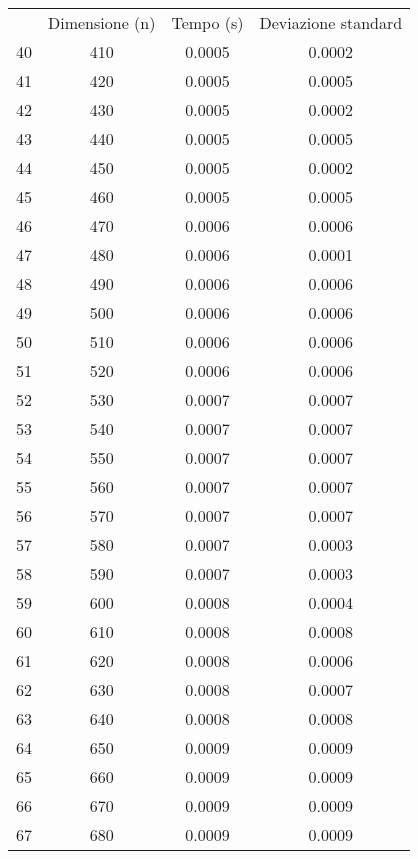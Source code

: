 \begin{table}
\centering
\begin{adjustbox}{width=1\textwidth/2}
\begin{tabular}{|c|c|c|c|}
\hline
 & Dimensione (n) & Tempo (s) & Deviazione standard \\
40 & 410 & 0.0005 & 0.0002 \\
\cline{1-4}
41 & 420 & 0.0005 & 0.0005 \\
\cline{1-4}
42 & 430 & 0.0005 & 0.0002 \\
\cline{1-4}
43 & 440 & 0.0005 & 0.0005 \\
\cline{1-4}
44 & 450 & 0.0005 & 0.0002 \\
\cline{1-4}
45 & 460 & 0.0005 & 0.0005 \\
\cline{1-4}
46 & 470 & 0.0006 & 0.0006 \\
\cline{1-4}
47 & 480 & 0.0006 & 0.0001 \\
\cline{1-4}
48 & 490 & 0.0006 & 0.0006 \\
\cline{1-4}
49 & 500 & 0.0006 & 0.0006 \\
\cline{1-4}
50 & 510 & 0.0006 & 0.0006 \\
\cline{1-4}
51 & 520 & 0.0006 & 0.0006 \\
\cline{1-4}
52 & 530 & 0.0007 & 0.0007 \\
\cline{1-4}
53 & 540 & 0.0007 & 0.0007 \\
\cline{1-4}
54 & 550 & 0.0007 & 0.0007 \\
\cline{1-4}
55 & 560 & 0.0007 & 0.0007 \\
\cline{1-4}
56 & 570 & 0.0007 & 0.0007 \\
\cline{1-4}
57 & 580 & 0.0007 & 0.0003 \\
\cline{1-4}
58 & 590 & 0.0007 & 0.0003 \\
\cline{1-4}
59 & 600 & 0.0008 & 0.0004 \\
\cline{1-4}
60 & 610 & 0.0008 & 0.0008 \\
\cline{1-4}
61 & 620 & 0.0008 & 0.0006 \\
\cline{1-4}
62 & 630 & 0.0008 & 0.0007 \\
\cline{1-4}
63 & 640 & 0.0008 & 0.0008 \\
\cline{1-4}
64 & 650 & 0.0009 & 0.0009 \\
\cline{1-4}
65 & 660 & 0.0009 & 0.0009 \\
\cline{1-4}
66 & 670 & 0.0009 & 0.0009 \\
\cline{1-4}
67 & 680 & 0.0009 & 0.0009 \\
\cline{1-4}

\end{tabular}
\end{adjustbox}
\end{table}
